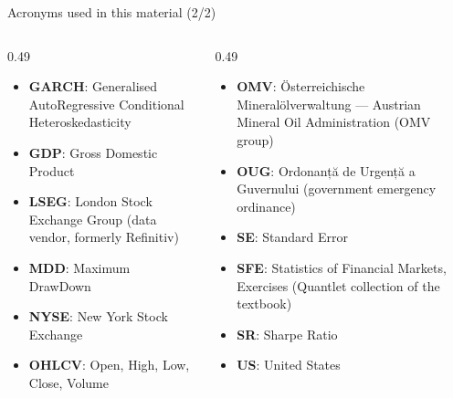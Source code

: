 \begin{frame}{Acronyms used in this material (2/2)}
\begin{columns}[T]
\begin{column}{0.49\textwidth}
\begin{itemize}\setlength{\itemsep}{0pt}
    \item \textbf{GARCH}: Generalised AutoRegressive Conditional Heteroskedasticity
    \item \textbf{GDP}: Gross Domestic Product
    \item \textbf{LSEG}: London Stock Exchange Group (data vendor, formerly Refinitiv)
    \item \textbf{MDD}: Maximum DrawDown
    \item \textbf{NYSE}: New York Stock Exchange
    \item \textbf{OHLCV}: Open, High, Low, Close, Volume
\end{itemize}
\end{column}
\begin{column}{0.49\textwidth}
\begin{itemize}\setlength{\itemsep}{0pt}
    \item \textbf{OMV}: Österreichische Mineralölverwaltung — Austrian Mineral Oil Administration (OMV group)
    \item \textbf{OUG}: Ordonanță de Urgență a Guvernului (government emergency ordinance)
    \item \textbf{SE}: Standard Error
    \item \textbf{SFE}: Statistics of Financial Markets, Exercises (Quantlet collection of the textbook)
    \item \textbf{SR}: Sharpe Ratio
    \item \textbf{US}: United States
\end{itemize}
\end{column}
\end{columns}
\end{frame}

